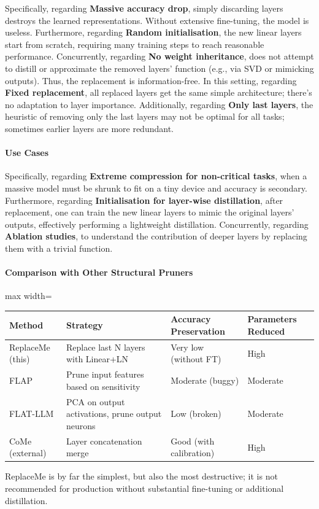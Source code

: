 Specifically, regarding \textbf{Massive accuracy drop}, simply discarding layers destroys the learned representations. Without extensive fine-tuning, the model is useless. Furthermore, regarding \textbf{Random initialisation}, the new linear layers start from scratch, requiring many training steps to reach reasonable performance. Concurrently, regarding \textbf{No weight inheritance}, does not attempt to distill or approximate the removed layers' function (e.g., via SVD or mimicking outputs). Thus, the replacement is information-free. In this setting, regarding \textbf{Fixed replacement}, all replaced layers get the same simple architecture; there's no adaptation to layer importance. Additionally, regarding \textbf{Only last layers}, the heuristic of removing only the last layers may not be optimal for all tasks; sometimes earlier layers are more redundant.


\paragraph{Use Cases}

Specifically, regarding \textbf{Extreme compression for non-critical tasks}, when a massive model must be shrunk to fit on a tiny device and accuracy is secondary. Furthermore, regarding \textbf{Initialisation for layer-wise distillation}, after replacement, one can train the new linear layers to mimic the original layers' outputs, effectively performing a lightweight distillation. Concurrently, regarding \textbf{Ablation studies}, to understand the contribution of deeper layers by replacing them with a trivial function.


\paragraph{Comparison with Other Structural Pruners}

\begin{center}
\begin{adjustbox}{max width=\columnwidth}
\renewcommand{\arraystretch}{1.2}
\begin{tabular}{llll}
\toprule
Method & Strategy & Accuracy Preservation & Parameters Reduced \\
\midrule
ReplaceMe (this) & Replace last N layers with Linear+LN & Very low (without FT) & High \\
FLAP & Prune input features based on sensitivity & Moderate (buggy) & Moderate \\
FLAT-LLM & PCA on output activations, prune output neurons & Low (broken) & Moderate \\
CoMe (external) & Layer concatenation merge & Good (with calibration) & High \\

\bottomrule
\end{tabular}
\end{adjustbox}
\end{center}
ReplaceMe is by far the simplest, but also the most destructive; it is not recommended for production without substantial fine-tuning or additional distillation.


